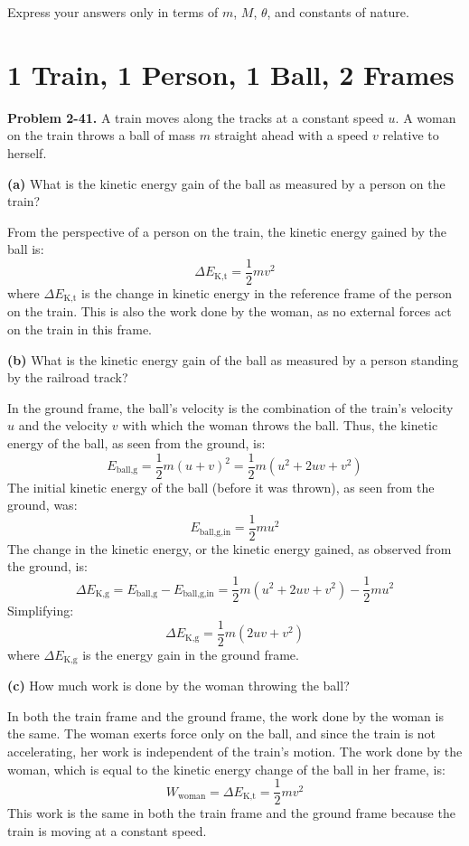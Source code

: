 \documentclass[12pt]{article}
\begin{document}
Express your answers only in terms of $m$, $M$, $\theta$, and constants of nature.




\section{1 Train, 1 Person, 1 Ball, 2 Frames}

\textbf{Problem 2-41.} A train moves along the tracks at a constant speed \(u\). A woman on the train throws a ball of mass \(m\) straight ahead with a speed \(v\) relative to herself.

\textbf{(a)} What is the kinetic energy gain of the ball as measured by a person on the train?

From the perspective of a person on the train, the kinetic energy gained by the ball is:
\[
\Delta E_{\text{K,t}} = \frac{1}{2}mv^2
\]
where \( \Delta E_{\text{K,t}} \) is the change in kinetic energy in the reference frame of the person on the train. This is also the work done by the woman, as no external forces act on the train in this frame.

\textbf{(b)} What is the kinetic energy gain of the ball as measured by a person standing by the railroad track?

In the ground frame, the ball’s velocity is the combination of the train's velocity \(u\) and the velocity \(v\) with which the woman throws the ball. Thus, the kinetic energy of the ball, as seen from the ground, is:
\[
E_{\text{ball,g}} = \frac{1}{2}m(u + v)^2 = \frac{1}{2}m(u^2 + 2uv + v^2)
\]
The initial kinetic energy of the ball (before it was thrown), as seen from the ground, was:
\[
E_{\text{ball,g,in}} = \frac{1}{2}mu^2
\]
The change in the kinetic energy, or the kinetic energy gained, as observed from the ground, is:
\[
\Delta E_{\text{K,g}} = E_{\text{ball,g}} - E_{\text{ball,g,in}} = \frac{1}{2}m(u^2 + 2uv + v^2) - \frac{1}{2}mu^2
\]
Simplifying:
\[
\Delta E_{\text{K,g}} = \frac{1}{2}m(2uv + v^2)
\]
where \( \Delta E_{\text{K,g}} \) is the energy gain in the ground frame.

\textbf{(c)} How much work is done by the woman throwing the ball?

In both the train frame and the ground frame, the work done by the woman is the same. The woman exerts force only on the ball, and since the train is not accelerating, her work is independent of the train’s motion. The work done by the woman, which is equal to the kinetic energy change of the ball in her frame, is:
\[
W_{\text{woman}} = \Delta E_{\text{K,t}} = \frac{1}{2}mv^2
\]
This work is the same in both the train frame and the ground frame because the train is moving at a constant speed.
\end{document}
